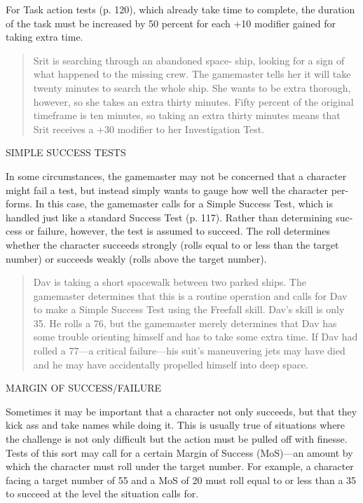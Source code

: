 For Task action tests (p. 120), which already take
time to complete, the duration of the task must be
increased by 50 percent for each +10 modifier gained
for taking extra time.

\begin{quotation}
  Srit is searching through an abandoned space- ship, looking for a
  sign of what happened to the missing crew. The gamemaster tells her
  it will take twenty minutes to search the whole ship. She wants to
  be extra thorough, however, so she takes an extra thirty
  minutes. Fifty percent of the original timeframe is ten minutes, so
  taking an extra thirty minutes means that Srit receives a +30
  modifier to her Investigation Test.
\end{quotation}

SIMPLE SUCCESS TESTS

In some circumstances, the gamemaster may not be
concerned that a character might fail a test, but instead
simply wants to gauge how well the character per-
forms. In this case, the gamemaster calls for a Simple
Success Test, which is handled just like a standard
Success Test (p. 117). Rather than determining suc-
cess or failure, however, the test is assumed to succeed.
The roll determines whether the character succeeds
strongly (rolls equal to or less than the target number)
or succeeds weakly (rolls above the target number).

\begin{quotation}
  Dav is taking a short spacewalk between two parked ships. The
  gamemaster determines that this is a routine operation and calls for
  Dav to make a Simple Success Test using the Freefall skill. Dav's
  skill is only 35. He rolls a 76, but the gamemaster merely
  determines that Dav has some trouble orienting himself and has to
  take some extra time.  If Dav had rolled a 77—a critical failure—his
  suit's maneuvering jets may have died and he may have accidentally
  propelled himself into deep space.
\end{quotation}

MARGIN OF SUCCESS/FAILURE

Sometimes it may be important that a character not
only succeeds, but that they kick ass and take names
while doing it. This is usually true of situations where
the challenge is not only difficult but the action must
be pulled off with finesse. Tests of this sort may call
for a certain Margin of Success (MoS)—an amount by
which the character must roll under the target number.
For example, a character facing a target number of 55
and a MoS of 20 must roll equal to or less than a 35
to succeed at the level the situation calls for.

